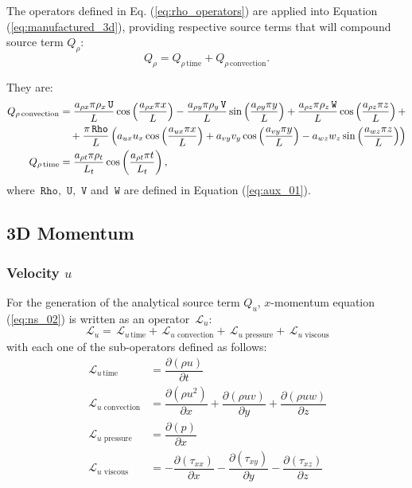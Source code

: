 \documentclass[10pt]{article}
\newcommand{\Diff}[2] {\dfrac{\partial( #1)}{\partial #2}}
\newcommand{\Rho}{\,\mathtt{Rho}}
\newcommand{\U}{\,\mathtt{U}}
\newcommand{\V}{\,\mathtt{V}}
\newcommand{\W}{\,\mathtt{W}}
\newcommand{\Lo}{\,\mathcal{L}}
\newcommand{\timee}{\,\text{time}}
\newcommand{\convection}{\,\text{convection}}
\newcommand{\viscous}{\,\text{viscous}}
\newcommand{\pressure}{\,\text{pressure}}
\begin{document}
The operators defined in Eq. (\ref{eq:rho_operators}) are applied into Equation  (\ref{eq:manufactured_3d}), providing respective source terms that will compound source term $Q_{\rho}$:
\begin{equation*}
 Q_{\rho} = Q_{\rho \, \text{time}}+Q_{\rho \, \text{convection}}.
\end{equation*}


They are:
\begin{equation*}
\begin{split}
 Q_{\rho \convection} &= \dfrac{a_{\rho x} \pi \rho_x \U }{L} \cos\left(\dfrac{a_{\rho x} \pi x}{L}\right)
-\dfrac{a_{\rho y} \pi \rho_y \V }{L} \sin\left(\dfrac{a_{\rho y} \pi y}{L}\right)
+\dfrac{a_{\rho z} \pi \rho_z \W }{L} \cos\left(\dfrac{a_{\rho z} \pi z}{L}\right)+\\
  &\quad
+ \dfrac{\pi \Rho}{L}\left(a_{ux} u_x \cos\left(\dfrac{a_{ux} \pi x}{L}\right)+a_{vy} v_y \cos\left(\dfrac{a_{vy} \pi y}{L}\right)-a_{wz} w_z \sin\left(\dfrac{a_{wz} \pi z}{L}\right)\right)  \\ \vspace{15pt}
%
Q_{\rho \timee} &= \dfrac{ a_{\rho t} \pi \rho_t }{L_t}\cos\left(\dfrac{a_{\rho t} \pi t}{L_t}\right) ,
\end{split}
\end{equation*}
where $\Rho,\,\U,\,\V$ and $\W$  are defined in Equation (\ref{eq:aux_01}).


\subsection{3D Momentum}


\subsubsection{Velocity $u$}
For the generation of the analytical source term $Q_u$, $x$-momentum equation (\ref{eq:ns_02}) is written as an operator $\Lo_u$:
 $$\Lo_u = \Lo_{u \, \text{time}}+\Lo_{u \, \convection}+\Lo_{u \, \pressure }+\Lo_{u \, \viscous }$$
with each one of the sub-operators defined as follows:
\begin{equation*}
 \begin{split}
\Lo_{u \, \text{time}}&= \Diff{\rho u}{t} \\
\Lo_{u \, \convection}&= \Diff{\rho u^2 }{x}+\Diff{\rho uv}{y} +\Diff{\rho uw}{z}\\
\Lo_{u \, \pressure }&= \Diff{p}{x}\\
\Lo_{u \, \viscous }&= -\Diff{\tau_{xx}}{x}-\Diff{\tau_{xy}}{y}-\Diff{\tau_{xz}}{z}
 \end{split}
\end{equation*}
\end{document}
